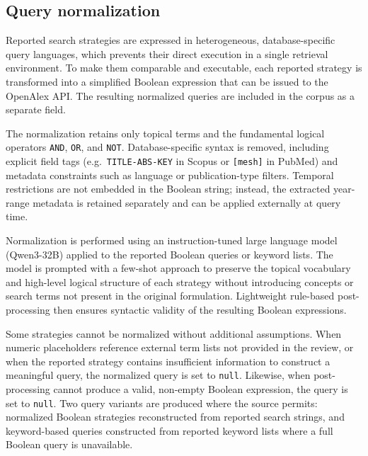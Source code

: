 \subsection*{Query normalization}
\label{sec:query-norm}
Reported search strategies are expressed in heterogeneous, database-specific query languages, which prevents their direct execution in a single retrieval environment. To make them comparable and executable, each reported strategy is transformed into a simplified Boolean expression that can be issued to the OpenAlex API. The resulting normalized queries are included in the corpus as a separate field.

The normalization retains only topical terms and the fundamental logical operators \texttt{AND}, \texttt{OR}, and \texttt{NOT}. Database-specific syntax is removed, including explicit field tags (e.g.\ \texttt{TITLE-ABS-KEY} in Scopus or \texttt{[mesh]} in PubMed) and metadata constraints such as language or publication-type filters. Temporal restrictions are not embedded in the Boolean string; instead, the extracted year-range metadata is retained separately and can be applied externally at query time.

Normalization is performed using an instruction-tuned large language model (Qwen3-32B) applied to the reported Boolean queries or keyword lists. The model is prompted with a few-shot approach to preserve the topical vocabulary and high-level logical structure of each strategy without introducing concepts or search terms not present in the original formulation. Lightweight rule-based post-processing then ensures syntactic validity of the resulting Boolean expressions.

Some strategies cannot be normalized without additional assumptions. When numeric placeholders reference external term lists not provided in the review, or when the reported strategy contains insufficient information to construct a meaningful query, the normalized query is set to \texttt{null}. Likewise, when post-processing cannot produce a valid, non-empty Boolean expression, the query is set to \texttt{null}. Two query variants are produced where the source permits: normalized Boolean strategies reconstructed from reported search strings, and keyword-based queries constructed from reported keyword lists where a full Boolean query is unavailable.